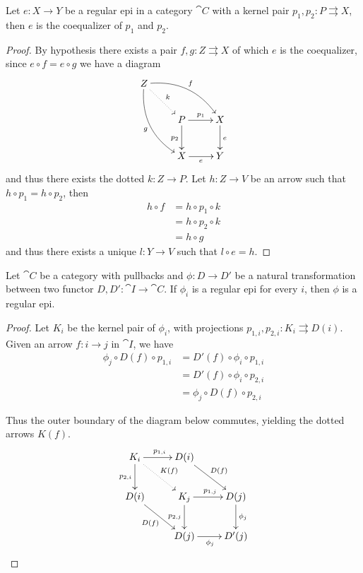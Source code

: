 {\begin{prop}\label{prop:regepi}
	Let $e\colon X\to Y$ be a regular epi in a category $\cat{C}$ with a kernel pair $p_1, p_2\colon P\rightrightarrows X$, then $e$ is the coequalizer of $p_1$ and $p_2$.
\end{prop}
\begin{proof}
	By hypothesis there exists a pair $f, g\colon Z\rightrightarrows X$ of which $e$ is the coequalizer, since $e\circ f=e\circ g$ we have a diagram
	\[\xymatrix{	Z \ar@/^.5cm/[drr]^{f} \ar@/_.5cm/[ddr]_{g} \ar@{.>}[dr]^{k}& &	\\ &P\ar[r]^{p_1} \ar[d]_{p_2} & X \ar[d]^{e} \\& X \ar[r]_{e}  & Y}\]
	and thus there exists  the dotted $k\colon Z\to P$. Let $h\colon Z\to V$ be an arrow such that $h\circ p_1=h\circ p_2$, then
	\begin{align*}h\circ f &= h \circ p_1\circ k \\&= h \circ p_2\circ k \\&=h\circ g
	\end{align*}
	and thus there exists a unique $l\colon Y\to V$ such that $l\circ e=h$.
\end{proof}


\begin{cor}\label{cor:regepi1}
Let $\cat{C}$ be a category with pullbacks and $\phi\colon D\to D'$ be a natural transformation between two functor $D, D'\colon \cat{I}\to \cat{C}$. If $\phi_i$ is a regular epi for every $i$, then $\phi$ is a regular epi.
\end{cor}
\begin{proof}
	Let $K_i$ be the kernel pair of $\phi_i$, with projections $p_{1,i}, p_{2,i}\colon K_i\rightrightarrows D(i)$. Given an arrow $f\colon i\to j$ in $\cat{I}$, we have 
	\begin{align*}
		\phi_j\circ D(f)\circ p_{1,i}&=D'(f)\circ \phi_i\circ p_{1,i}\\&=D'(f)\circ \phi_i\circ p_{2,i}\\&=\phi_j\circ D(f)\circ p_{2,i}
	\end{align*}
	
	
	Thus the outer boundary of the diagram below commutes, yielding the dotted arrows $K(f)$.
	\[\xymatrix{K_i \ar@{.>}[dr]^{K(f)}\ar[r]^{p_{1,i}} \ar[d]_{p_{2,i}}& D(i) \ar[dr]^{D(f)}\\D(i) \ar[dr]_{D(f)}&K_j \ar[r]^{p_{1,j}} \ar[d]_{p_{2,j}} & D(j) \ar[d]^{\phi_j}\\ &D(j) \ar[r]_{\phi_j} & D'(j)}\]
	

\end{proof}}
